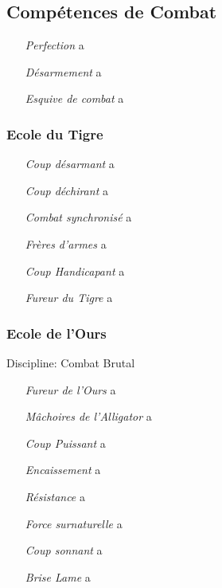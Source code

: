\subsection{Compétences de Combat}

\begin{itemize}
\item[\em Perfection] a
\item[\em Désarmement] a
\item[\em Esquive de combat] a
\end{itemize}

\subsubsection{Ecole du Tigre}
\begin{itemize}
\item[\em Coup désarmant] a
\item[\em Coup déchirant] a
\item[\em Combat synchronisé] a
\item[\em Frères d’armes] a
\item[\em Coup Handicapant] a
\item[\em Fureur du Tigre] a
\end{itemize}

\subsubsection{Ecole de l'Ours}
Discipline: Combat Brutal
\begin{itemize}
\item[\em Fureur de l'Ours] a
\item[\em Mâchoires de l'Alligator] a
\item[\em Coup Puissant]  a
\item[\em Encaissement] a
\item[\em Résistance] a
\item[\em Force surnaturelle] a
\item[\em Coup sonnant] a
\item[\em Brise Lame] a
\end{itemize}

